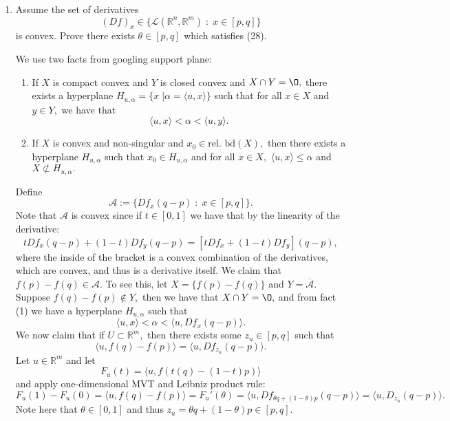 \documentclass[11pt]{article}
\newcommand{\bbR}{\mathbb{R}}
\renewcommand{\emptyset}{\O}
\begin{document}
\begin{enumerate}
\begin{solution}
    \end{solution}
    \item 
    \begin{problem}
    Assume the set of derivatives 
    \[(Df)_x \in \{\mathscr{L}(\bbR^n, \bbR^m)\; : \; x\in [p,q]\}\] is convex. Prove there exists $\theta \in [p,q]$ which satisfies (28).    
    \end{problem}
    \begin{solution}
        We use two facts from googling support plane:
        \begin{enumerate}
            \item If $X$ is compact convex and $Y$ is closed convex and $X \cap Y = \emptyset,$ there exists a hyperplane $H_{u,\alpha} = \{x \; | \alpha = \langle u, x \rangle\}$ such that for all $x \in X$ and $y \in Y,$ we have that 
            \[\langle u, x\rangle < \alpha < \langle u, y\rangle.\]
            \item If $X$ is convex and non-singular and $x_0 \in \text{rel. bd}(X),$ then there exists a hyperplane $H_{u,\alpha}$ such that $x_0 \in H_{u, \alpha}$ and for all $x\in X,$ $\langle u, x\rangle \leq \alpha$ and $X \not \subset H_{u,\alpha}.$
        \end{enumerate}
        Define 
        \[\mathscr{A} := \{Df_x(q-p) \; : \; x \in [p,q]\}.\] Note that $\mathscr{A}$ is convex since if $t \in [0,1]$ we have that by the linearity of the derivative:
        \[tDf_x(q-p) + (1-t)Df_y(q-p) = [tDf_x + (1-t)Df_y](q-p),\] where the inside of the bracket is a convex combination of the derivatives, which are convex, and thus is a derivative itself. We claim that $f(p) - f(q)\in \mathscr{A}.$ To see this, let $X = \{f(p) - f(q)\}$ and $Y = \overline{\mathscr{A}}.$ Suppose $f(q) - f(p)\not \in Y,$ then we have that $X \cap Y  = \emptyset,$ and from fact (1) we have a hyperplane $H_{u,\alpha}$ such that 
        \[\langle u, x\rangle < \alpha < \langle u, Df_x(q-p)\rangle.\]
        We now claim that if $U \subset \bbR^m,$ then there exists some $z_u\in [p,q]$ such that 
        \[\langle u, f(q) - f(p)\rangle = \langle u, Df_{z_u}(q-p)\rangle.\] Let $u \in \bbR^m$ and let \[F_u(t) = \langle u, f\left(t(q) - (1-t)p\right)\rangle\] and apply one-dimensional MVT and Leibniz product rule:
        \[F_u(1) - F_u(0) = \langle u, f(q) - f(p)\rangle = F_u'(\theta) = \langle u, Df_{\theta q + (1-\theta)p}(q-p)\rangle = \langle u, D_{z_u}(q-p)\rangle.\] Note here that $\theta \in [0,1]$ and thus $z_u  = \theta q + (1-\theta)p\in [p,q].$\\


\end{solution}
\end{enumerate}
\end{document}
